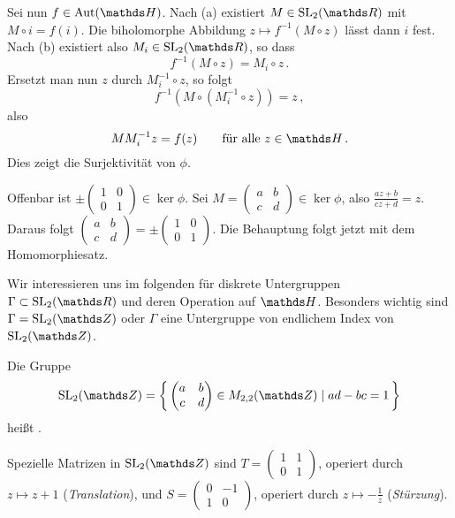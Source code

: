 \begin{bewe-list}
Sei nun $f\in\Aut(\HH)$.
Nach (a) existiert $M\in\SL_2(\RR)$ mit $M\circ i = f(i)$.
Die biholomorphe Abbildung $z\mapsto f^{-1}(M\circ z)$ lässt dann $i$ fest.
Nach (b) existiert also $M_i \in \SL_2(\RR)$, so dass
\[
	f^{-1}(M \circ z) = M_i \circ z
	\,.
\]
Ersetzt man nun $z$ durch $M_i^{-1} \circ z$, so folgt
\[
	f^{-1}(M \circ (M_i^{-1} \circ z))
	= z
	\,,
\]
also
\[
	MM_i^{-1}z = f(z)
	\qquad \text{für alle } z \in \HH
	\,.
\]
Dies zeigt die Surjektivität von $\phi$.

Offenbar ist $\pm (\begin{smallmatrix} 1 & 0\\ 0 & 1\end{smallmatrix}) \in \ker \phi$.
Sei $M = (\begin{smallmatrix} a & b\\ c & d\end{smallmatrix}) \in \ker \phi$, also $\frac{az+b}{cz+d} = z$.
Daraus folgt $(\begin{smallmatrix} a & b\\ c & d\end{smallmatrix}) = \pm (\begin{smallmatrix} 1 & 0\\ 0 & 1\end{smallmatrix})$.
Die Behauptung folgt jetzt mit dem Homomorphiesatz.
\end{bewe-list}

Wir interessieren uns im folgenden für diskrete Untergruppen $\Gamma \subset \SL_2(\RR)$ und deren Operation auf $\HH$.
Besonders wichtig sind $\Gamma = \SL_2(\ZZ)$ oder $\Gamma$ eine Untergruppe von endlichem Index von $\SL_2(\ZZ)$.

\begin{defi}
Die Gruppe
\[
	\SL_2(\ZZ) = \Set{ \begin{pmatrix} a & b \\ c& d\end{pmatrix} \in M_{2,2}(\ZZ) \mid ad-bc = 1}
\]
heißt .

Spezielle Matrizen in $\SL_2(\ZZ)$ sind $T = (\begin{smallmatrix} 1 & 1 \\ 0 & 1\end{smallmatrix})$, operiert durch $z \mapsto z + 1$ (\emph{Translation}), und $S = (\begin{smallmatrix} 0 & -1 \\ 1 & 0\end{smallmatrix})$, operiert durch $z \mapsto -\frac{1}{z}$ (\emph{Stürzung}).
\end{defi}

